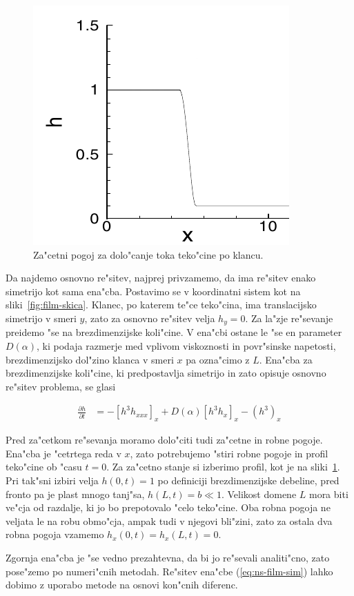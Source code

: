 \documentclass[a4paper,12pt]{article}
\newcommand{\odv}[1]{\frac{\partial #1}{\partial t}}
\begin{document}
\begin{figure}[h]
 \centering
 \includegraphics[width=.5\textwidth]{./Slike/film-zacetni}
 \caption{Za"cetni pogoj za dolo"canje toka teko"cine po klancu. }
 \label{fig:film-zacetni}
\end{figure}


Da najdemo osnovno re"sitev, najprej privzamemo, da ima re"sitev enako simetrijo kot sama ena"cba. Postavimo se v koordinatni sistem kot na sliki~\ref{fig:film-skica}. Klanec, po katerem te"ce teko"cina, ima translacijsko simetrijo v smeri $y$, zato za osnovno re"sitev velja $h_y = 0$. Za la"zje re"sevanje preidemo "se na brezdimenzijske koli"cine. V ena"cbi ostane le "se en parameter $D(\alpha)$, ki podaja razmerje med vplivom viskoznosti in povr"sinske napetosti, brezdimenzijsko dol"zino klanca v smeri $x$ pa ozna"cimo z $L$. Ena"cba za brezdimenzijske koli"cine, ki predpostavlja simetrijo in zato opisuje osnovno re"sitev problema, se glasi

\begin{align}
  \label{eq:ns-film-sim}
 \odv{h} &= - \left[h^3 h_{xxx}\right]_x + D(\alpha) \left[h^3 h_x\right]_x - \left(h^3\right)_x
\end{align}

Pred za"cetkom re"sevanja moramo dolo"citi tudi za"cetne in robne pogoje. Ena"cba je "cetrtega reda v $x$, zato potrebujemo "stiri robne pogoje in profil teko"cine ob "casu $t=0$. Za za"cetno stanje si izberimo profil, kot je na sliki~\ref{fig:film-zacetni}. Pri tak"sni izbiri velja $h(0, t) = 1$ po definiciji brezdimenzijske debeline, pred fronto pa je plast mnogo tanj"sa, $h(L, t) = b \ll 1$. Velikost domene $L$ mora biti ve"cja od razdalje, ki jo bo prepotovalo "celo teko"cine. Oba robna pogoja ne veljata le na robu obmo"cja, ampak tudi v njegovi bli"zini, zato za ostala dva robna pogoja vzamemo $h_x(0,t) = h_x(L,t) = 0$. 

Zgornja ena"cba je "se vedno prezahtevna, da bi jo re"sevali analiti"cno, zato pose"zemo po numeri"cnih metodah. Re"sitev ena"cbe (\ref{eq:ns-film-sim}) lahko dobimo z uporabo metode na osnovi kon"cnih diferenc. 
\end{document}
